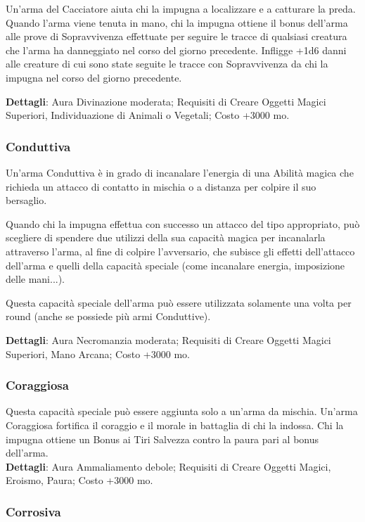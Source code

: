 \begin{multicols}{2}
Un'arma del Cacciatore aiuta chi la impugna a localizzare e a catturare la preda. Quando l'arma viene tenuta in mano, chi la impugna ottiene il bonus dell'arma alle prove di Sopravvivenza effettuate per seguire le tracce di qualsiasi creatura che l'arma ha danneggiato nel corso del giorno precedente. Infligge +1d6 danni alle creature di cui sono state seguite le tracce con Sopravvivenza da chi la impugna nel corso del giorno precedente.

\textbf{Dettagli}: Aura Divinazione moderata; Requisiti di Creare Oggetti Magici Superiori, Individuazione di Animali o Vegetali; Costo +3000 mo.

\subsubsection{Conduttiva}

Un'arma Conduttiva è in grado di incanalare l'energia di una Abilità magica che richieda un attacco di contatto in mischia o a distanza per colpire il suo bersaglio. 

Quando chi la impugna effettua con successo un attacco del tipo appropriato, può scegliere di spendere due utilizzi della sua capacità magica per incanalarla attraverso l'arma, al fine di colpire l'avversario, che subisce gli effetti dell'attacco dell'arma e quelli della capacità speciale (come incanalare energia, imposizione delle mani...).

Questa capacità speciale dell'arma può essere utilizzata solamente una volta per round (anche se possiede più armi Conduttive).

\textbf{Dettagli}: Aura Necromanzia moderata; Requisiti di Creare Oggetti Magici Superiori, Mano Arcana; Costo +3000 mo.


\subsubsection{Coraggiosa}

Questa capacità speciale può essere aggiunta solo a un'arma da mischia. Un'arma Coraggiosa fortifica il coraggio e il morale in battaglia di chi la indossa. Chi la impugna ottiene un Bonus ai Tiri Salvezza contro la paura pari al bonus dell'arma.\\ 

\textbf{Dettagli}: Aura Ammaliamento debole; Requisiti di Creare Oggetti Magici, Eroismo, Paura; Costo +3000 mo.

\subsubsection{Corrosiva}


\end{multicols}
